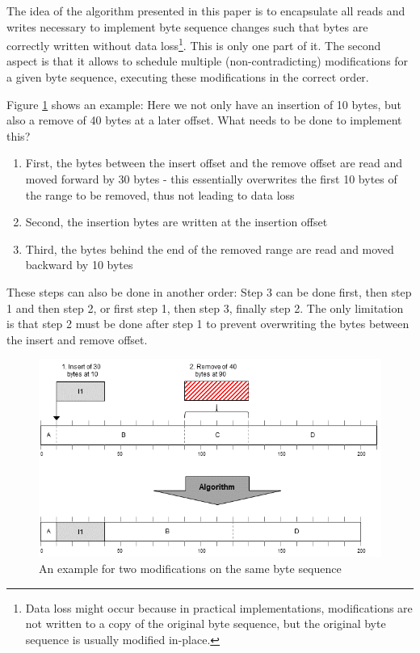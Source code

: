 \documentclass[english, 10pt, openright, twocolumn, landscape, twoside, notitlepage, a4paper, pdftex]		
{article}
\begin{document}
The idea of the algorithm presented in this paper is to encapsulate all reads and writes necessary to implement byte sequence changes such that bytes are correctly written without data loss\footnote{Data loss might occur because in practical implementations, modifications are not written to a copy of the original byte sequence, but the original byte sequence is usually modified in-place.}. This is only one part of it. The second aspect is that it allows to schedule multiple (non-contradicting) modifications for a given byte sequence, executing these modifications in the correct order.

Figure \ref{fig:Changes} shows an example: Here we not only have an insertion of 10 bytes, but also a remove of 40 bytes at a later offset. What needs to be done to implement this?
\begin{enumerate}
\item First, the bytes between the insert offset and the remove offset are read and moved forward by 30 bytes - this essentially overwrites the first 10 bytes of the range to be removed, thus not leading to data loss
\item Second, the insertion bytes are written at the insertion offset
\item Third, the bytes behind the end of the removed range are read and moved backward by 10 bytes
\end{enumerate}

These steps can also be done in another order: Step 3 can be done first, then step 1 and then step 2, or first step 1, then step 3, finally step 2. The only limitation is that step 2 must be done after step 1 to prevent overwriting the bytes between the insert and remove offset.

\begin{figure}[htbp]
\centering
\includegraphics[width=1.00\columnwidth]{figures/Changes.png}
\caption{An example for two modifications on the same byte sequence}
\label{fig:Changes}
\end{figure}
\end{document}
